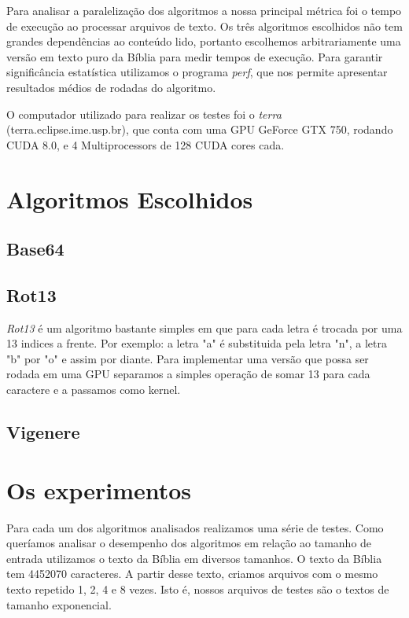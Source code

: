 \documentclass[12pt]{article}
\begin{document}
Para analisar a paralelização dos algoritmos a nossa principal métrica
foi o tempo de execução ao processar arquivos de texto. Os três 
algoritmos escolhidos não tem grandes dependências ao conteúdo lido, 
portanto escolhemos arbitrariamente uma versão em texto puro da Bíblia
para medir tempos de execução. Para garantir significância estatística
utilizamos o programa \emph{perf}, que nos permite apresentar resultados
médios de rodadas do algoritmo.

O computador utilizado para realizar os testes foi o \emph{terra} (terra.eclipse.ime.usp.br), que conta com uma GPU GeForce GTX 750, rodando CUDA 8.0, e 4 Multiprocessors de 128 CUDA cores cada. 

\newpage
\section{Algoritmos Escolhidos}
\subsection{Base64}
\subsection{Rot13}
\emph{Rot13} é um algoritmo bastante simples em que para cada letra é trocada por uma 13 indices a frente. Por exemplo: a letra "a" é substituida pela letra "n", a letra "b" por "o" e assim por diante.
Para implementar uma versão que possa ser rodada em uma GPU separamos a simples operação de somar 13 para cada caractere e a passamos como kernel. 
\subsection{Vigenere}



\newpage
\section{Os experimentos}
Para cada um dos algoritmos analisados realizamos uma série de testes. 
Como queríamos analisar o desempenho dos algoritmos em relação ao tamanho de entrada utilizamos o texto da Bíblia em diversos tamanhos. O texto da Bíblia tem 4452070 caracteres. A partir desse texto, criamos arquivos com o mesmo texto repetido 1, 2, 4 e 8 vezes. Isto é, nossos arquivos de testes são o textos de tamanho exponencial.
\end{document}
